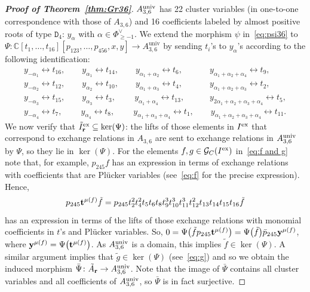 \documentclass[pdftex]{sigma}%
\numberwithin{equation}{section}
\DeclareMathOperator{\univ}{univ}
\begin{document}
\begin{proof}[{\bf Proof of Theorem~\ref{thm:Gr36}}]
 \medskip
  $A_{3,6}^{\rm univ}$ has 22 cluster variables (in one-to-one correspondence with those of $A_{3,6}$) and 16 coefficients labeled by almost positive roots of type ${\mathtt D}_4$: $y_\alpha$ with $\alpha\in \Phi_{\geq -1}^{\vee}$.
 We extend the morphism $\psi$
 in~\eqref{eq:psi36} to $\Psi\colon \mathbb C[t_1,\dots,t_{16}][p_{123}, \dots , p_{456}, x,y]\to A_{3,6}^{\univ}$ by sending $t_i$'s to $y_\alpha$'s according to the following identification:
\begin{gather}\label{eq:y-t}
y_{-\alpha_1} \leftrightarrow t_{16},\qquad
y_{\alpha_1} \leftrightarrow t_{14},\qquad
y_{\alpha_1 + \alpha_2} \leftrightarrow t_{6},\qquad\quad\
y_{\alpha_1 +\alpha_2+\alpha_4} \leftrightarrow t_{9}, \nonumber
\\
y_{-\alpha_2} \leftrightarrow t_{12},\qquad
y_{\alpha_2} \leftrightarrow t_{10},\qquad
y_{\alpha_1 + \alpha_3} \leftrightarrow t_{4},\qquad\quad\
y_{\alpha_1 +\alpha_2+\alpha_3} \leftrightarrow t_{2}, \nonumber
\\
y_{-\alpha_3} \leftrightarrow t_{15},\qquad
y_{\alpha_3} \leftrightarrow t_{3},\qquad\
y_{\alpha_1 + \alpha_4} \leftrightarrow t_{13},\qquad\quad
y_{2\alpha_1 + \alpha_2+\alpha_3+\alpha_4} \leftrightarrow t_{5}, \nonumber
\\
y_{-\alpha_4} \leftrightarrow t_{7},\qquad\
y_{\alpha_4} \leftrightarrow t_{8},\qquad\
y_{\alpha_1 +\alpha_3+\alpha_4} \leftrightarrow t_{1},\qquad
y_{\alpha_1 + \alpha_2+\alpha_3+\alpha_4} \leftrightarrow t_{11}.
 \end{gather}
 We now verify that $\tilde I^{\rm ex}_{\bf r}\subseteq \ker(\Psi)$: the lifts of those elements in $I^{\rm ex}$ that correspond to exchange relations in $A_{3,6}$ are sent to exchange relations in $A_{3,6}^{\rm univ}$ by $\Psi$, so they lie in $\ker(\Psi)$.
 For the elements $f,g\in\mathcal{G}_C(I^{\rm ex})$ in~\eqref{eq:f and g}
 note that, for example, $p_{245}f$ has an expression in terms of exchange relations with coefficients that are Pl\"ucker variables (see~\eqref{eq:f} for the precise expression).
 Hence,
 \begin{displaymath}
 p_{245}{\bf t}^{\mu(f)}\tilde f= p_{245}t_2^2t_4^2t_5t_6t_8t_9^3t_{10}^3t_{11}^3t_{12}^2t_{13}t_{14}t_{15}t_{16}\tilde f
 \end{displaymath}
 has an expression in terms of the lifts of those exchange relations with monomial coefficients in $t$'s and Pl\"ucker variables.
 So, $ 0=\Psi\big(\tilde fp_{245}{\bf t}^{\mu(f)}\big)=\Psi\big(\tilde f\big)\bar p_{245}{\bf y}^{\mu(f)}$,
 where ${\bf y}^{\mu(f)}=\Psi\big({\bf t}^{\mu(f)}\big)$.
 As $A_{3,6}^{\rm univ}$ is a domain, this implies $\tilde f\in \ker(\Psi)$.
 A similar argument implies that $\tilde g\in \ker(\Psi)$ (see~\eqref{eq:g}) and so we obtain the induced morphism $\bar\Psi\colon \tilde A_{\bf r}\to A_{3,6}^{\rm univ}$.
 Note that the image of $\bar \Psi$ contains all cluster variables and all coefficients of $A_{3,6}^{\rm univ}$, so $\bar \Psi$ is in fact surjective.


\end{proof}
\end{document}
